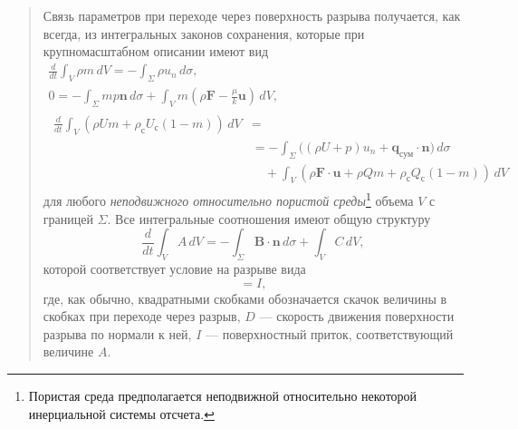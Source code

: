 \documentclass[12pt,a4paper]{article}
\newenvironment{textquote}{\begin{quote}\sloppy}{\end{quote}}
\begin{document}
\begin{textquote}
Связь параметров при переходе через поверхность разрыва получается, как всегда, из интегральных законов сохранения, которые при крупномасштабном описании имеют вид
\begin{equation}
\begin{gathered}
\frac{d}{dt}\int_V\rho m\,dV=-\int_\Sigma\rho u_n\,d\sigma,\\
0=-\int_\Sigma mp\boldsymbol{n}\,d\sigma+\int_V m\left(\rho\boldsymbol{F}-\frac{\mu}{k}\boldsymbol{u}\right)\,dV,\\
\begin{aligned}
\frac{d}{dt}\int_V(\rho Um+\rho_{\text{с}}U_{\text{с}}(1-m))\,dV&=\\
&=-\int_\Sigma\bigl((\rho U+p)u_n+\boldsymbol{q}_{\text{сум}}\cdot\boldsymbol{n}\bigr)\,d\sigma\\
&\quad+\int_V(\rho\boldsymbol{F}\cdot\boldsymbol{u}+\rho Qm+\rho_{\text{с}}Q_{\text{с}}(1-m))\,dV
\end{aligned}
\end{gathered}
\tag{6.1}\label{q3:eq-6-1}
\end{equation}
для любого \textit{неподвижного относительно пористой среды}\footnote[1]{Пористая среда предполагается неподвижной относительно некоторой инерциальной системы отсчета.} объема $V$ с границей $\Sigma$. Все интегральные соотношения имеют общую структуру
\[
\frac{d}{dt}\int_V A\,dV=-\int_\Sigma\boldsymbol{B}\cdot\boldsymbol{n}\,d\sigma+\int_V C\,dV,
\]
которой соответствует условие на разрыве вида
\begin{equation}
[AD-\boldsymbol{B}\cdot\boldsymbol{n}]=I,
\tag{6.2}\label{q3:eq-6-2}
\end{equation}
где, как обычно, квадратными скобками обозначается скачок величины в скобках при переходе через разрыв, $D$ --- скорость движения поверхности разрыва по нормали к ней, $I$ --- поверхностный приток, соответствующий величине $A$.
\end{textquote}
\end{document}
